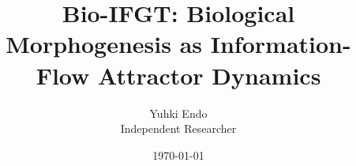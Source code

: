 \documentclass[11pt]{article}
\title{Bio-IFGT: Biological Morphogenesis as Information-Flow Attractor Dynamics}
\author{
Yuhki Endo\\
Independent Researcher\\
}
\date{\today}
\begin{document}
\maketitle

\begin{abstract}

\end{abstract}

\setcounter{tocdepth}{1}
\tableofcontents
\clearpage















\end{document}
